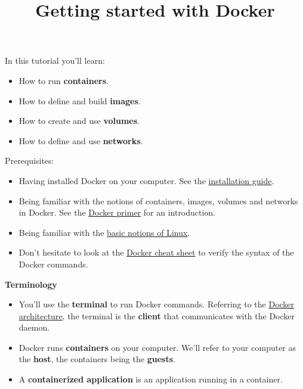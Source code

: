 \documentclass[
]{article}
\title{Getting started with Docker}
\author{}
\date{\vspace{-2.5em}}
\providecommand{\tightlist}{%
  \setlength{\itemsep}{0pt}\setlength{\parskip}{0pt}}
\newenvironment{infobox}[1]
  {
  \begin{itemize}
  \renewcommand{\labelitemi}{
    \raisebox{-.7\height}[0pt][0pt]{
      
    }
  }
  \setlength{\fboxsep}{1em}
  \begin{whitebox}
  \item
  }
  {
  \end{whitebox}
  \end{itemize}
  }
\theoremstyle{definition}
\theoremstyle{definition}
\theoremstyle{definition}
\theoremstyle{remark}
\begin{document}
\maketitle

In this tutorial you'll learn:

\begin{itemize}
\tightlist
\item
  How to run \textbf{containers}.
\item
  How to define and build \textbf{images}.
\item
  How to create and use \textbf{volumes}.
\item
  How to define and use \textbf{networks}.
\end{itemize}

Prerequisites:

\begin{itemize}
\tightlist
\item
  Having installed Docker on your computer.
  See the \href{/courses/cloud-computing/installing-docker}{installation guide}.
\item
  Being familiar with the notions of containers, images,
  volumes and networks in Docker.
  See the \href{/courses/cloud-computing/docker-primer}{Docker primer}
  for an introduction.
\item
  Being familiar with the \href{/courses/cloud-computing/linux-introduction}{basic notions of Linux}.
\item
  Don't hesitate to look at the \href{/courses/cloud-computing/docker-cheat-sheet}{Docker cheat sheet}
  to verify the syntax of the Docker commands.
\end{itemize}

\begin{infobox}{warning}

\textbf{Terminology}

\begin{itemize}
\item
  You'll use the \textbf{terminal} to run Docker commands.
  Referring to the
  \href{/courses/cloud-computing/docker-primer\#fig:docker-architecture}{Docker architecture},
  the terminal is the \textbf{client} that communicates with
  the Docker daemon.
\item
  Docker runs \textbf{containers} on your computer.
  We'll refer to your computer as the \textbf{host},
  the containers being the \textbf{guests}.
\end{itemize}

\begin{itemize}
\tightlist
\item
  A \textbf{containerized application}
  is an application running in a container.
\end{itemize}

\end{infobox}
\end{document}
